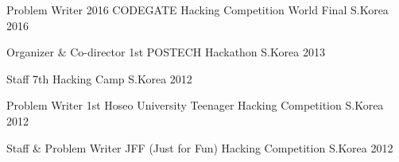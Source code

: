 

\begin{cvhonors}

  \cvhonor
    {Problem Writer} %
    {2016 CODEGATE Hacking Competition World Final} %
    {S.Korea} %
    {2016} %

  \cvhonor
    {Organizer \& Co-director} %
    {1st POSTECH Hackathon} %
    {S.Korea} %
    {2013} %

  \cvhonor
    {Staff} %
    {7th Hacking Camp} %
    {S.Korea} %
    {2012} %

  \cvhonor
    {Problem Writer} %
    {1st Hoseo University Teenager Hacking Competition} %
    {S.Korea} %
    {2012} %

  \cvhonor
    {Staff \& Problem Writer} %
    {JFF (Just for Fun) Hacking Competition} %
    {S.Korea} %
    {2012} %

\end{cvhonors}
